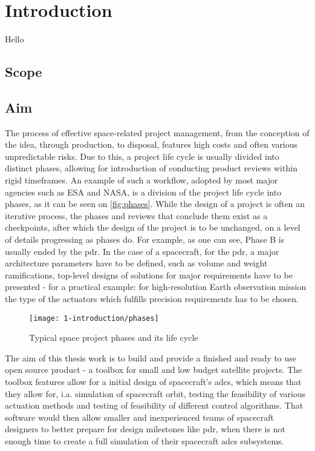 \section{Introduction}
Hello

\subsection{Scope}

\subsection{Aim}
    The process of effective space-related project management, from the conception of the idea, through production, to disposal, features high costs and often various unpredictable risks. Due to this, a project life cycle is usually divided into distinct phases, allowing for introduction of conducting product reviews within rigid timeframes. An example of such a workflow, adopted by most major agencies such as ESA\cite{managementecss} and NASA\cite{kapurch2010nasa}, is a division of the project life cycle into phases, as it can be seen on \autoref{fig:phases}. While the design of a project is often an iterative process, the phases and reviews that conclude them exist as a checkpoints, after which the design of the project is to be unchanged, on a level of details progressing as phases do. For example, as one can see, Phase B is usually ended by the \ac{pdr}. In the case of a spacecraft, for the \ac{pdr}, a major architecture parameters have to be defined, such as volume and weight ramifications, top-level designs of solutions for major requirements have to be presented - for a practical example: for high-resolution Earth observation mission the type of the actuators which fulfills precision requirements has to be chosen.

    \begin{figure}[h]
        \centering
        \texttt{[image: 1-introduction/phases]}
        \caption{Typical space project phases and its life cycle\cite{nguyen2000effective}}
        \label{fig:phases}
    \end{figure}

    The aim of this thesis work is to build and provide a finished and ready to use open source product - a toolbox for small and low budget satellite projects.  The toolbox features allow for a initial design of spacecraft's \ac{adcs}, which means that they allow for, i.a. simulation of spacecraft orbit, testing the feasibility of various actuation methods and testing of feasibility of different control algorithms.  That software would then allow smaller and inexperienced teams of spacecraft designers to better prepare for design milestones like \ac{pdr}, when there is not enough time to create a full simulation of their spacecraft \ac{adcs} subsystems.

